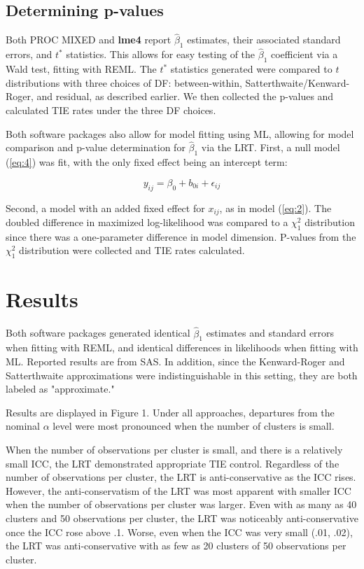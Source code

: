 \documentclass[twocolumn]{bmcart}%
\begin{document}
\subsection*{Determining p-values}

Both PROC MIXED and \textbf{lme4} report $\hat{\beta}_1$ estimates, their associated standard errors, and $t^*$ statistics. This allows for easy testing of the $\hat{\beta}_1$ coefficient via a Wald test, fitting with REML. The $t^*$ statistics generated were compared to $t$ distributions with three choices of DF: between-within, Satterthwaite/Kenward-Roger, and residual, as described earlier. We then collected the p-values and calculated TIE rates under the three DF choices.

Both software packages also allow for model fitting using ML, allowing for model comparison and p-value determination for $\hat{\beta}_1$ via the LRT. First, a null model (\ref{eq:4}) was fit, with the only fixed effect being an intercept term:

\begin{equation}
  \label{eq:4}
  y_{ij} = \beta_0 + b_{0i} + \epsilon_{ij}
\end{equation}

Second, a model with an added fixed effect for $x_{ij}$, as in model (\ref{eq:2}). The doubled difference in maximized log-likelihood was compared to a $\chi^2_1$ distribution since there was a one-parameter difference in model dimension. P-values from the $\chi^2_1$ distribution were collected and TIE rates calculated.


\section*{Results}

Both software packages generated identical $\hat{\beta}_1$ estimates and standard errors when fitting with REML, and identical differences in likelihoods when fitting with ML. Reported results are from SAS. In addition, since the Kenward-Roger and Satterthwaite approximations were indistinguishable in this setting, they are both labeled as "approximate."

Results are displayed in Figure 1.  Under all approaches, departures from the nominal $\alpha$ level were most pronounced when the number of clusters is small.

When the number of observations per cluster is small, and there is a relatively small ICC, the LRT demonstrated appropriate TIE control. Regardless of the number of observations per cluster, the LRT is anti-conservative as the ICC rises. However, the anti-conservatism of the LRT was most apparent with smaller ICC when the number of observations per cluster was larger. Even with as many as 40 clusters and 50 observations per cluster, the LRT was noticeably anti-conservative once the ICC rose above .1. Worse, even when the ICC was very small (.01, .02), the LRT was anti-conservative with as few as 20 clusters of 50 observations per cluster.
\end{document}
